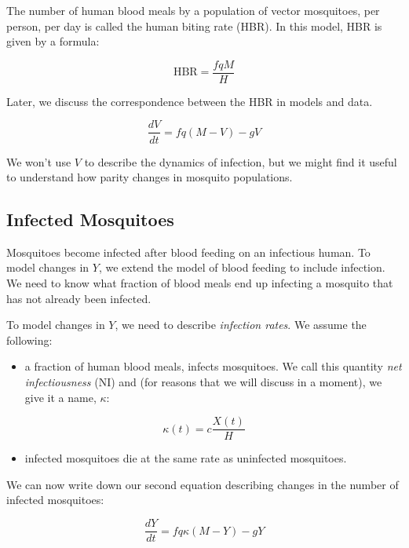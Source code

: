 \documentclass[
]{book}
\providecommand{\tightlist}{%
  \setlength{\itemsep}{0pt}\setlength{\parskip}{0pt}}
\begin{document}
The number of human blood meals by a population of vector mosquitoes, per person, per day is called the human biting rate (HBR). In this model, HBR is given by a formula:

\[\mbox{HBR} = \frac{fqM}{H}\]

Later, we discuss the correspondence between the HBR in models and data.

\begin{equation}
\frac{dV}{dt} = f q (M-V) - g V
\end{equation}

We won't use \(V\) to describe the dynamics of infection, but we might find it useful to understand how parity changes in mosquito populations.

\hypertarget{infected-mosquitoes}{%
\subsection{Infected Mosquitoes}\label{infected-mosquitoes}}

Mosquitoes become infected after blood feeding on an infectious human. To model changes in \(Y\), we extend the model of blood feeding to include infection. We need to know what fraction of blood meals end up infecting a mosquito that has not already been infected.

To model changes in \(Y\), we need to describe \emph{infection rates}. We assume the following:

\begin{itemize}
\tightlist
\item
  a fraction of human blood meals, infects mosquitoes. We call this quantity \emph{net infectiousness} (NI) and (for reasons that we will discuss in a moment), we give it a name, \(\kappa\):
\end{itemize}

\begin{equation}
\kappa(t) = c \frac{X(t)}{H}
\label{eq:kappaDef}
\end{equation}

\begin{itemize}
\tightlist
\item
  infected mosquitoes die at the same rate as uninfected mosquitoes.
\end{itemize}

We can now write down our second equation describing changes in the number of infected mosquitoes:

\begin{equation}
\frac{dY}{dt} = f q \kappa (M-Y) -g Y
\end{equation}
\end{document}
